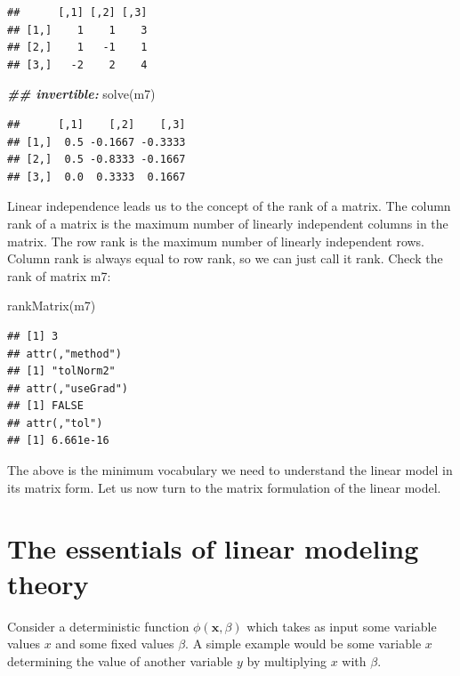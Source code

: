 \documentclass[
  12pt,
]{krantz}
\newenvironment{Shaded}{\begin{snugshade}}{\end{snugshade}}
\newcommand{\DocumentationTok}[1]{\textcolor[rgb]{0.56,0.35,0.01}{\textbf{\textit{#1}}}}
\newcommand{\FunctionTok}[1]{\textcolor[rgb]{0.00,0.00,0.00}{#1}}
\newcommand{\NormalTok}[1]{#1}
\theoremstyle{definition}
\theoremstyle{definition}
\theoremstyle{definition}
\theoremstyle{definition}
\theoremstyle{remark}
\begin{document}
\begin{verbatim}
##      [,1] [,2] [,3]
## [1,]    1    1    3
## [2,]    1   -1    1
## [3,]   -2    2    4
\end{verbatim}

\begin{Shaded}
\begin{Highlighting}[]
\DocumentationTok{\#\# invertible:}
\FunctionTok{solve}\NormalTok{(m7)}
\end{Highlighting}
\end{Shaded}

\begin{verbatim}
##      [,1]    [,2]    [,3]
## [1,]  0.5 -0.1667 -0.3333
## [2,]  0.5 -0.8333 -0.1667
## [3,]  0.0  0.3333  0.1667
\end{verbatim}

Linear independence leads us to the concept of the rank of a matrix.
The column rank of a matrix is the maximum number of linearly independent columns in the matrix. The row rank is the maximum number of linearly independent rows. Column rank is always equal to row rank, so we can just call it rank. Check the rank of matrix m7:

\begin{Shaded}
\begin{Highlighting}[]
\FunctionTok{rankMatrix}\NormalTok{(m7)}
\end{Highlighting}
\end{Shaded}

\begin{verbatim}
## [1] 3
## attr(,"method")
## [1] "tolNorm2"
## attr(,"useGrad")
## [1] FALSE
## attr(,"tol")
## [1] 6.661e-16
\end{verbatim}

The above is the minimum vocabulary we need to understand the linear model in its matrix form. Let us now turn to the matrix formulation of the linear model.

\hypertarget{the-essentials-of-linear-modeling-theory}{%
\section{The essentials of linear modeling theory}\label{the-essentials-of-linear-modeling-theory}}

Consider a deterministic function \(\phi(\mathbf{x},\beta)\) which takes as input some variable values \(x\) and some fixed values \(\beta\). A simple example would be some variable \(x\) determining the value of another variable \(y\) by multiplying \(x\) with \(\beta\).
\end{document}
